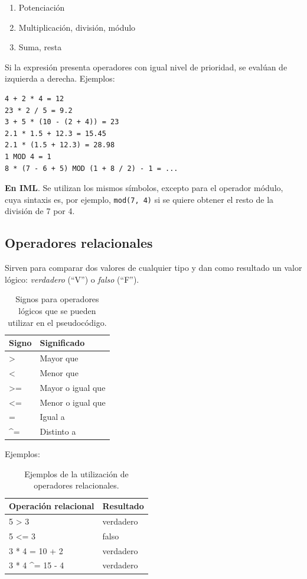 \documentclass[]{book}
\providecommand{\tightlist}{%
  \setlength{\itemsep}{0pt}\setlength{\parskip}{0pt}}
\begin{document}
\begin{enumerate}
\def\labelenumi{\arabic{enumi}.}
\tightlist
\item
  Potenciación
\item
  Multiplicación, división, módulo
\item
  Suma, resta
\end{enumerate}

Si la expresión presenta operadores con igual nivel de prioridad, se evalúan de izquierda a derecha. Ejemplos:

\begin{verbatim}
4 + 2 * 4 = 12
23 * 2 / 5 = 9.2
3 + 5 * (10 - (2 + 4)) = 23
2.1 * 1.5 + 12.3 = 15.45
2.1 * (1.5 + 12.3) = 28.98
1 MOD 4 = 1
8 * (7 - 6 + 5) MOD (1 + 8 / 2) - 1 = ...
\end{verbatim}

\textbf{En IML}. Se utilizan los mismos símbolos, excepto para el operador módulo, cuya sintaxis es, por ejemplo, \texttt{mod(7,\ 4)} si se quiere obtener el resto de la división de 7 por 4.

\hypertarget{operadores-relacionales}{%
\subsection{Operadores relacionales}\label{operadores-relacionales}}

Sirven para comparar dos valores de cualquier tipo y dan como resultado un valor lógico: \emph{verdadero} (``V'') o \emph{falso} (``F'').

\begin{table}[t]

\caption{\label{tab:unnamed-chunk-14}Signos para operadores lógicos que se pueden utilizar en el pseudocódigo.}
\centering
\begin{tabular}{l|l}
\hline
Signo & Significado\\
\hline
> & Mayor que\\
\hline
< & Menor que\\
\hline
>= & Mayor o igual que\\
\hline
<= & Menor o igual que\\
\hline
= & Igual a\\
\hline
\textasciicircum{}= & Distinto a\\
\hline
\end{tabular}
\end{table}

Ejemplos:

\begin{table}[t]

\caption{\label{tab:unnamed-chunk-15}Ejemplos de la utilización de operadores relacionales.}
\centering
\begin{tabular}{l|l}
\hline
Operación relacional & Resultado\\
\hline
5 > 3 & verdadero\\
\hline
5 <= 3 & falso\\
\hline
3 * 4 = 10 + 2 & verdadero\\
\hline
3 * 4 \textasciicircum{}= 15 - 4 & verdadero\\
\hline
\end{tabular}
\end{table}
\end{document}
